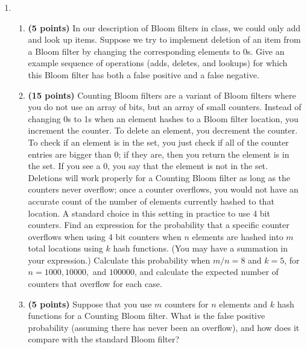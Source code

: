 \documentclass[10pt]{article}
\begin{document}
\begin{enumerate}
\item 
\begin{enumerate}
\item 
{\bf (5 points)}
In our description of Bloom filters in class, we could only add and look up items.
Suppose we try to implement deletion of an item from a Bloom filter by changing the corresponding elements to 0s.
Give an example sequence of operations (adds, deletes, and lookups) for which this Bloom filter has both
a false positive and a false negative.
\item 
{\bf (15 points)}
  Counting Bloom filters are a variant of Bloom filters where 
  you do not use an array of bits, but an array of small counters. 
  Instead of changing 0s to 1s when an element hashes to a Bloom 
  filter location, you increment the counter.  To delete an element,
  you decrement the counter.  To check if an element is in the set,
  you just check if all of the counter entries are bigger than 0;
  if they are, then you return the element is in the set.  If you
  see a 0, you say that the element is not in the set. Deletions will work properly for a Counting Bloom filter
as long as the counters never overflow;  once a counter overflows, you would
not have an accurate count of the number of elements currently hashed to
that location. A standard choice in this setting in practice to use 4 bit counters. 
 Find an expression for the probability that a specific counter overflows when using 
4 bit counters when $n$ elements are hashed into $m$ total locations using 
$k$ hash functions.  (You may have a summation in your expression.)  
Calculate this probability when $m/n = 8$ and $k=5$, for $n=1000, 10000,$ and $100000$, and calculate the expected number of counters that overflow for each case.  
\item 
{\bf (5 points)}
Suppose that you use $m$ counters for $n$ elements and
  $k$ hash functions for a Counting Bloom filter.  What is the false
  positive probability (assuming there has never been an overflow),
  and how does it compare with the standard Bloom filter?
\end{enumerate}


\end{enumerate}
\end{document}
